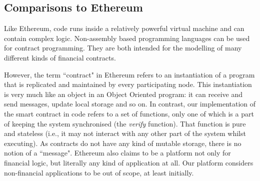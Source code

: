 \documentclass{article}
\begin{document}
\subsection{Comparisons to Ethereum}
Like Ethereum, code runs inside a relatively powerful virtual machine and can contain complex logic. Non-assembly based programming languages can be used for contract programming.  They are both intended for the modelling of many different kinds of financial contracts.

However, the term ``contract" in Ethereum refers to an instantiation of a program that is replicated and maintained by every participating node. This instantiation is very much like an object in an Object Oriented program: it can receive and send messages, update local storage and so on. In contrast, our implementation of the smart contract in code refers to a set of functions, only one of which is a part of keeping the system synchronised (the \textit{verify} function). That function is pure and stateless (i.e., it may not interact with any other part of the system whilst executing).	As contracts do not have any kind of mutable storage, there is no notion of a ``message". Ethereum also claims to be a platform not only for financial logic, but literally any kind of application at all. Our platform considers non-financial applications to be out of scope, at least initially.


\end{document}
